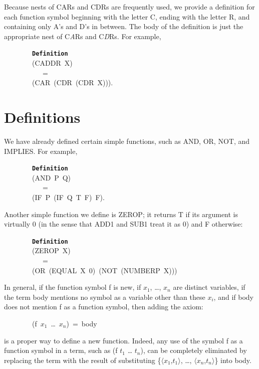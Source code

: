 \documentclass[11pt]{book}
\newenvironment{pubasis}{\begin{flushleft}\ttfamily\small}{\normalsize\rmfamily\end{flushleft}}
\newcommand{\axiomordefinition}[1]{\vspace{6pt}\texttt{\textbf{#1}}}
\newcommand{\pubinlineunderline}[1]{\emph{#1}}
\newcommand{\pubdefaulttextsize}{\large}
\begin{document}
\par\pagebreak[0]\hrulefill\nopagebreak\par
Because nests of CARs and CDRs are frequently used, we provide a definition
for each function symbol beginning with the letter C, ending with the letter
R, and containing only A's and D's in between.  The body of the definition
is just the appropriate nest of  C\pubinlineunderline{A}Rs and C\pubinlineunderline{D}Rs.  For example,
\begin{pubasis}
~~~~~~~~\axiomordefinition{Definition}\\
~~~~~~~~(CADDR~X)\\
~~~~~~~~~~~=\\
~~~~~~~~(CAR~(CDR~(CDR~X))).\\
\end{pubasis}
\nopagebreak\par\hrulefill\nopagebreak\par
\section{Definitions}
\pubdefaulttextsize
We have already defined certain
simple functions, such as AND, OR, NOT, and IMPLIES.  For example,
\begin{pubasis}
~~~~~~~~\axiomordefinition{Definition}\\
~~~~~~~~(AND~P~Q)\\
~~~~~~~~~~~=\\
~~~~~~~~(IF~P~(IF~Q~T~F)~F).\\
\end{pubasis}
Another simple function we  define is ZEROP;  it returns
T if its argument is virtually 0 (in the sense that ADD1 and
SUB1 treat it as 0) and F otherwise:
\begin{pubasis}
\par\pagebreak[0]\hrulefill\nopagebreak\par
~~~~~~~~\axiomordefinition{Definition}\\
~~~~~~~~(ZEROP~X)\\
~~~~~~~~~~~=\\
~~~~~~~~(OR~(EQUAL~X~0)~(NOT~(NUMBERP~X)))\\

\nopagebreak\par\hrulefill\nopagebreak\par
\end{pubasis}
In general, if the function symbol f is new, if
$x_{1}$, \ldots{}, $x_{n}$ are distinct variables,
if the term body mentions no symbol as a variable other than these
$x_{i}$,  and if body does not mention f as a function symbol,
then adding the axiom:
\begin{pubasis}
~~~~~~~~(f~$x_{1}$~\ldots{}~$x_{n}$)~=~body\\
\end{pubasis}
is a proper way to define a new function.
Indeed, any use of the symbol f as a function symbol in a term, such
as (f $t_{1}$ \ldots{} $t_{n}$), can be completely eliminated by replacing the term
with the result of substituting \{$\langle x_{1}$,$t_{1} \rangle$, \ldots{}, $\langle x_{n}$,$t_{n} \rangle$\}
into body.
\end{document}
